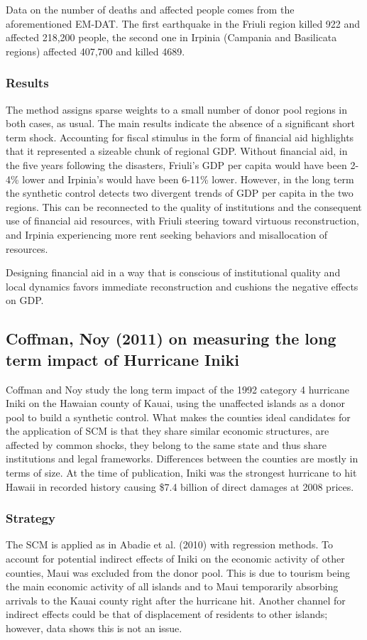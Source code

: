 \documentclass[12pt,a4paper,draft]{article}
\begin{document}
Data on the number of deaths and affected people comes from the aforementioned EM-DAT. The 
first earthquake in the Friuli region killed 922 and affected 218,200 people, the second one 
in Irpinia (Campania and Basilicata regions) affected 407,700 and killed 4689.

\subsubsection{Results}
The method assigns sparse weights to a small number of donor pool regions in both cases, as usual.
The main results indicate the absence of a significant short term shock. 
Accounting for fiscal stimulus in the form of financial aid highlights that it 
represented a sizeable chunk of regional GDP.
Without financial aid, in the five years following the disasters, Friuli's GDP per capita would 
have been 2-4\% lower and Irpinia's would have been 6-11\% lower. 
However, in the long term the synthetic 
control detects two divergent trends of GDP per capita in the two regions. 
This can be reconnected to 
the quality of institutions and the consequent use of financial aid resources, with Friuli steering 
toward virtuous reconstruction, and Irpinia experiencing more rent seeking behaviors and misallocation 
of resources.  

Designing financial aid in a way that is conscious of institutional quality and local 
dynamics favors immediate reconstruction and cushions the negative effects on GDP.



\subsection{Coffman, Noy (2011) on measuring the long term impact of Hurricane Iniki}
Coffman and Noy study the long term impact of the 1992 category 4 hurricane Iniki on 
the Hawaian county of Kauai, using the unaffected islands as a donor pool to build 
a synthetic control. 
What makes the counties ideal candidates for the application of SCM is that they share 
similar economic structures, are affected by common shocks, they belong to the same 
state and thus share institutions and legal frameworks. 
Differences between the counties are mostly in terms of size.
At the time of publication, Iniki was the strongest hurricane to hit Hawaii in recorded 
history causing \$7.4 billion of direct damages at 2008 prices.

\subsubsection{Strategy}
The SCM is applied as in Abadie et al. (2010) with regression methods. %
To account for potential indirect effects of Iniki on the economic activity of other 
counties, Maui was excluded from the donor pool. This is due to tourism being the 
main economic activity of all islands and to Maui temporarily absorbing arrivals to 
the Kauai county right after the hurricane hit. 
Another channel for indirect effects could be that of displacement of residents to 
other islands; however, data shows this is not an issue. 
\end{document}

